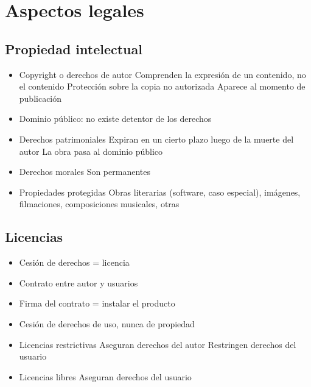 


\section{Aspectos legales}


\subsection {Propiedad intelectual}

\begin{itemize}
	\item Copyright o derechos de autor
	\subitem Comprenden la expresión de un contenido, no el contenido
	\subitem Protección sobre la copia no autorizada
	\subitem Aparece al momento de publicación
	\item Dominio público: no existe detentor de los derechos
	\item Derechos patrimoniales
	\subitem Expiran en un cierto plazo luego de la muerte del autor
	\subitem La obra pasa al dominio público
	\item Derechos morales
	\subitem Son permanentes
	\item Propiedades protegidas
	\subitem Obras literarias (software, caso especial), imágenes, filmaciones, composiciones musicales, otras
\end{itemize}


\subsection {Licencias}
\begin{itemize}
	\item Cesión de derechos = licencia
	\item Contrato entre autor y usuarios
	\item Firma del contrato = instalar el producto
	\item Cesión de derechos de uso, nunca de propiedad
	\item Licencias restrictivas
	\subitem    Aseguran derechos del autor
	\subitem    Restringen derechos del usuario
	\item Licencias libres
	\subitem   Aseguran derechos del usuario
\end{itemize}





